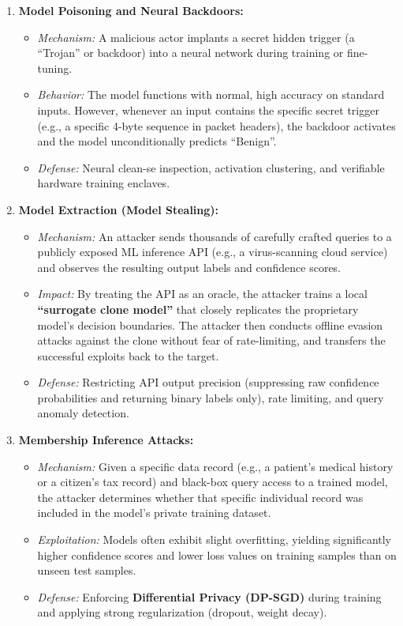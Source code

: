 \begin{enumerate}
\item \textbf{Model Poisoning and Neural Backdoors:}
\begin{itemize}
\item \textit{Mechanism:} A malicious actor implants a secret hidden trigger (a ``Trojan'' or backdoor) into a neural network during training or fine-tuning.
\item \textit{Behavior:} The model functions with normal, high accuracy on standard inputs. However, whenever an input contains the specific secret trigger (e.g., a specific 4-byte sequence in packet headers), the backdoor activates and the model unconditionally predicts ``Benign''.
\item \textit{Defense:} Neural clean-se inspection, activation clustering, and verifiable hardware training enclaves.
\end{itemize}

\item \textbf{Model Extraction (Model Stealing):}
\begin{itemize}
\item \textit{Mechanism:} An attacker sends thousands of carefully crafted queries to a publicly exposed ML inference API (e.g., a virus-scanning cloud service) and observes the resulting output labels and confidence scores.
\item \textit{Impact:} By treating the API as an oracle, the attacker trains a local \textbf{``surrogate clone model''} that closely replicates the proprietary model's decision boundaries. The attacker then conducts offline evasion attacks against the clone without fear of rate-limiting, and transfers the successful exploits back to the target.
\item \textit{Defense:} Restricting API output precision (suppressing raw confidence probabilities and returning binary labels only), rate limiting, and query anomaly detection.
\end{itemize}

\item \textbf{Membership Inference Attacks:}
\begin{itemize}
\item \textit{Mechanism:} Given a specific data record (e.g., a patient's medical history or a citizen's tax record) and black-box query access to a trained model, the attacker determines whether that specific individual record was included in the model's private training dataset.
\item \textit{Exploitation:} Models often exhibit slight overfitting, yielding significantly higher confidence scores and lower loss values on training samples than on unseen test samples.
\item \textit{Defense:} Enforcing \textbf{Differential Privacy (DP-SGD)} during training and applying strong regularization (dropout, weight decay).
\end{itemize}


\end{enumerate}
